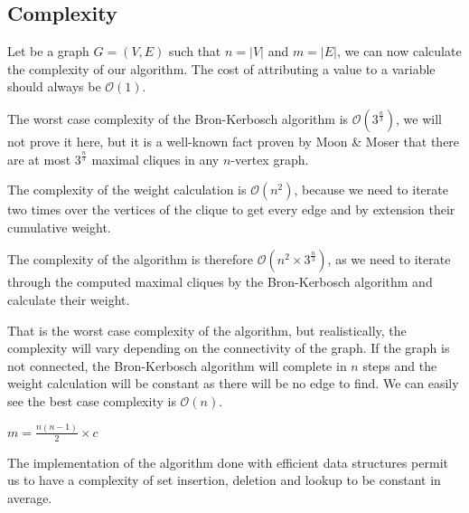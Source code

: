\subsection{Complexity}

Let be a graph $G=(V,E)$ such that $n=|V|$ and $m=|E|$, we can now calculate the
complexity of our algorithm. The cost of attributing a value to a variable should
always be $\mathcal{O}(1)$. \newline

The worst case complexity of the Bron-Kerbosch algorithm is $\mathcal{O}(3^{\frac{n}{3}})$,
we will not prove it here, but it is a well-known fact proven by Moon \& Moser
\cite{on-cliques-in-graphs} that there are at most $3^{\frac{n}{3}}$ maximal cliques
in any $n$-vertex graph. \newline

The complexity of the weight calculation is $\mathcal{O}(n^2)$, because we need
to iterate two times over the vertices of the clique to get every edge and by
extension their cumulative weight. \newline

The complexity of the algorithm is therefore $\mathcal{O}(n^2\times3^{\frac{n}{3}})$,
as we need to iterate through the computed maximal cliques by the Bron-Kerbosch
algorithm and calculate their weight. \newline

That is the worst case complexity of the algorithm, but realistically, the complexity
will vary depending on the connectivity of the graph. If the graph is not connected,
the Bron-Kerbosch algorithm will complete in $n$ steps and the weight calculation
will be constant as there will be no edge to find. We can easily see the best case
complexity is $\mathcal{O}(n)$. \newline

$m=\frac{n(n-1)}{2}\times c$

The implementation of the algorithm done with efficient data structures permit us
to have a complexity of set insertion, deletion and lookup to be constant in average.
